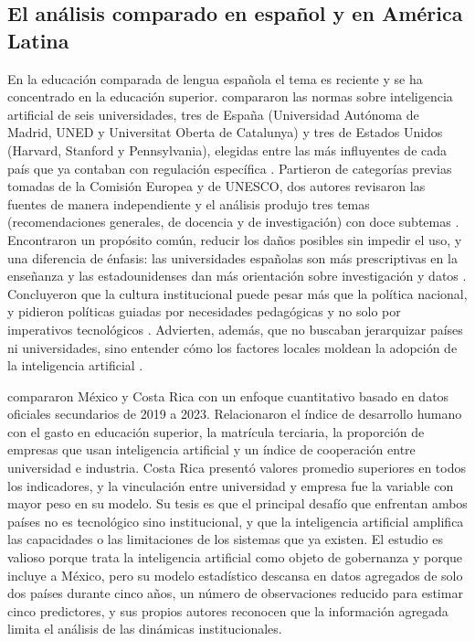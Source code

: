 \subsection{El análisis comparado en español y en América Latina}
\label{subsec:ea-latam}

En la educación comparada de lengua española el tema es reciente y se ha concentrado en la
educación superior. \citet{martinezrojas2026regulacion} compararon las normas sobre
inteligencia artificial de seis universidades, tres de España (Universidad Autónoma de
Madrid, UNED y Universitat Oberta de Catalunya) y tres de Estados Unidos (Harvard, Stanford
y Pennsylvania), elegidas entre las más influyentes de cada país que ya contaban con
regulación específica \citep[pp.~423--424]{martinezrojas2026regulacion}. Partieron de
categorías previas tomadas de la Comisión Europea y de UNESCO, dos autores revisaron las
fuentes de manera independiente y el análisis produjo tres temas (recomendaciones
generales, de docencia y de investigación) con doce subtemas
\citep[pp.~425--426]{martinezrojas2026regulacion}. Encontraron un propósito común, reducir
los daños posibles sin impedir el uso, y una diferencia de énfasis: las universidades
españolas son más prescriptivas en la enseñanza y las estadounidenses dan más orientación
sobre investigación y datos \citep[pp.~431, 436]{martinezrojas2026regulacion}. Concluyeron
que la cultura institucional puede pesar más que la política nacional, y pidieron
políticas guiadas por necesidades pedagógicas y no solo por imperativos tecnológicos
\citep[pp.~435--436]{martinezrojas2026regulacion}. Advierten, además, que no buscaban
jerarquizar países ni universidades, sino entender cómo los factores locales moldean la
adopción de la inteligencia artificial \citep[p.~424]{martinezrojas2026regulacion}.

\citet{lara2026gobernanza} compararon México y Costa Rica con un enfoque cuantitativo
basado en datos oficiales secundarios de 2019 a 2023. Relacionaron el índice de desarrollo
humano con el gasto en educación superior, la matrícula terciaria, la proporción de
empresas que usan inteligencia artificial y un índice de cooperación entre universidad e
industria. Costa Rica presentó valores promedio superiores en todos los indicadores, y la
vinculación entre universidad y empresa fue la variable con mayor peso en su modelo. Su
tesis es que el principal desafío que enfrentan ambos países no es tecnológico sino
institucional, y que la inteligencia artificial amplifica las capacidades o las
limitaciones de los sistemas que ya existen. El estudio es valioso porque trata la
inteligencia artificial como objeto de gobernanza y porque incluye a México, pero su
modelo estadístico descansa en datos agregados de solo dos países durante cinco años, un
número de observaciones reducido para estimar cinco predictores, y sus propios autores
reconocen que la información agregada limita el análisis de las dinámicas institucionales.

